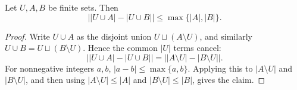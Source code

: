 \begin{helper}
Let \(U,A,B\) be finite sets. Then
\[
\bigl||U\cup A|-|U\cup B|\bigr|\le \max\{|A|,|B|\}.
\]
\end{helper}
\begin{proof}
Write \(U\cup A\) as the disjoint union \(U\sqcup(A\setminus U)\), and similarly
\(U\cup B=U\sqcup(B\setminus U)\). Hence the common \(|U|\) terms cancel:
\[
\bigl||U\cup A|-|U\cup B|\bigr|
=\bigl||A\setminus U|-|B\setminus U|\bigr|.
\]
For nonnegative integers \(a,b\), \(|a-b|\le\max\{a,b\}\). Applying this to
\(|A\setminus U|\) and \(|B\setminus U|\), and then using
\(|A\setminus U|\le |A|\) and \(|B\setminus U|\le |B|\), gives the claim.
\end{proof}

